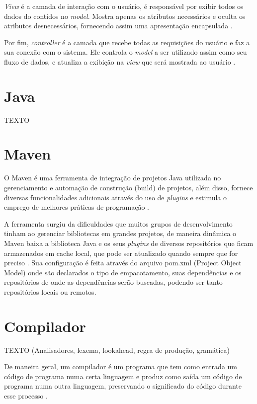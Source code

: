 \documentclass{bcc}
\begin{document}
 \textit{View} é a camada de interação com o usuário, é responsável por exibir todos os dados do contidos no \textit{model}. Mostra apenas os atributos necessários e oculta os atributos desnecessários, fornecendo assim uma apresentação encapsulada \cite{jailia2016}.
 
 Por fim, \textit{controller} é a camada que recebe todas as requisições do usuário e faz a sua conexão com o sistema. Ele controla o \textit{model} a ser utilizado assim como seu fluxo de dados, e atualiza a exibição na \textit{view} que será mostrada ao usuário \cite{jailia2016}. 

\section{Java}

TEXTO

\section{Maven}

O Maven é uma ferramenta de integração de projetos Java utilizada no gerenciamento e automação de construção (build) de projetos, além disso, fornece diversas funcionalidades adicionais através do uso de \textit{plugins} e estimula o emprego de melhores práticas de programação \cite{maven}.

A ferramenta surgiu da dificuldades que muitos grupos de desenvolvimento tinham ao gerenciar bibliotecas em grandes projetos, de maneira dinâmica o Maven baixa a biblioteca Java e os seus \textit{plugins} de diversos repositórios que ficam armazenados em cache local, que pode ser atualizado quando sempre que for preciso \cite{oliveira2016}. Sua configuração é feita através do arquivo pom.xml (Project Object Model) onde são declarados o tipo de empacotamento, suas dependências e os repositórios de onde as dependências serão buscadas, podendo ser tanto repositórios locais ou remotos. \cite{junior2014}


\section{Compilador}
TEXTO (Analisadores, lexema, lookahead, regra de produção, gramática)

De maneira geral, um compilador é um programa que tem como entrada um código de programa numa certa linguagem e produz como saída um código de programa numa outra linguagem, preservando o significado do código durante esse processo \cite{grune2012}.
\end{document}

